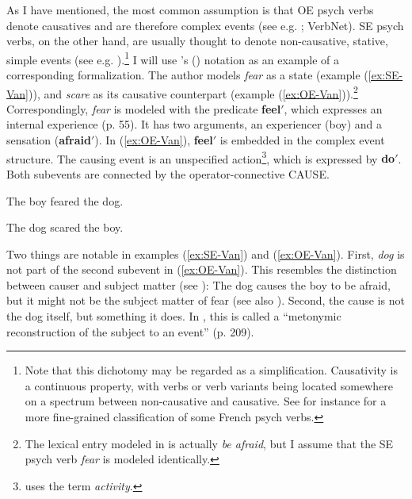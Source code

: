As I have mentioned, the most common assumption is that OE psych verbs denote causatives and are therefore complex events (see e.g. \citealt{Grimshaw.1990, Pustejovsky.1991, DiDesidero.1993, Pesetsky.1995, VanValinJr.1997, VanValin.2005, Martin.2013}; VerbNet). SE psych verbs, on the other hand, are usually thought to denote non-causative, stative, simple events (see e.g. \citealt{Grimshaw.1990,DiDesidero.1993,VanValinJr.1997,Levin.2006b}).\footnote{Note that this dichotomy may be regarded as a simplification. Causativity is a continuous property, with verbs \textendash{} or verb variants \textendash{} being located somewhere on a spectrum between non-causative and causative. See for instance \citet{Kailuweit.2005} for a more fine-grained classification of some French psych verbs.}
I will use \citeauthor{VanValin.2005}'s (\citeyear{VanValin.2005}) notation as an example of a corresponding formalization.  
The author models \textit{fear} as a state (example (\ref{ex:SE-Van})), and \textit{scare} as its causative counterpart (example (\ref{ex:OE-Van})).\footnote{The lexical entry modeled in \citet[66]{VanValin.2005} is actually \textit{be afraid}, but I assume that the SE psych verb \textit{fear} is modeled identically.}
Correspondingly, \textit{fear} is modeled with the predicate \textbf{feel$'$}, which expresses an internal experience (p. 55). It has two arguments, an experiencer (boy) and a sensation (\textbf{afraid$'$}).
In (\ref{ex:OE-Van}), \textbf{feel$'$} is embedded in the complex event structure. The causing event is an unspecified action\footnote{\citet{VanValin.2005} uses the term \textit{activity}.}, which is expressed by \textbf{do$'$}. Both subevents are connected by the operator-connective CAUSE.

	\begin{exe}
		\ex \label{ex:SE-Van} 
		\begin{xlist}
			\ex The boy feared the dog.
		\end{xlist} 
	\end{exe}
	\begin{exe}
		\ex \label{ex:OE-Van} 
		\begin{xlist}
			\ex The dog scared the boy. 
			\ex {[ \textbf{do$'$}(dog, $\emptyset$) ] CAUSE [ \textbf{feel$'$} (boy, [ \textbf{afraid$'$} ] ) ]}
		\end{xlist}
	\end{exe}

\noindent Two things are notable in examples (\ref{ex:SE-Van}) and (\ref{ex:OE-Van}).
First, \textit{dog} is not part of the second subevent in (\ref{ex:OE-Van}). This resembles the distinction between causer and subject matter (see ): The dog causes the boy to be afraid, but it might not be the subject matter of fear (see also \citealt[38]{VanValin.2005}). 
Second, the cause is not the dog itself, but something it does. In \citet[]{Pustejovsky.1995}, this is called a ``metonymic reconstruction of the subject to an event'' (p. 209). 

